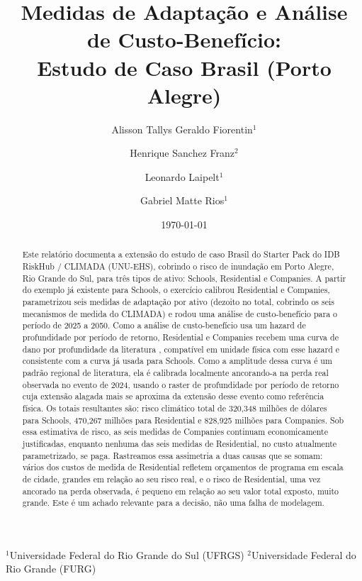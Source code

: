 \documentclass[11pt]{article}
\title{Medidas de Adaptação e Análise de Custo-Benefício:\\Estudo de Caso Brasil (Porto Alegre)}
\author{
Alisson Tallys Geraldo Fiorentin$^{1}$ \and
Henrique Sanchez Franz$^{2}$ \and
Leonardo Laipelt$^{1}$ \and
Gabriel Matte Rios$^{1}$
}
\date{\today}
\begin{document}
\maketitle

\begin{center}
\footnotesize
$^{1}$Universidade Federal do Rio Grande do Sul (UFRGS) \quad
$^{2}$Universidade Federal do Rio Grande (FURG)
\end{center}
\vspace{1em}

\begin{abstract}
Este relatório documenta a extensão do estudo de caso Brasil do Starter Pack do IDB
RiskHub / CLIMADA (UNU-EHS), cobrindo o risco de inundação em Porto Alegre, Rio Grande do
Sul, para três tipos de ativo: Schools, Residential e Companies. A partir do exemplo já
existente para Schools, o exercício calibrou Residential e Companies, parametrizou seis
medidas de adaptação por ativo (dezoito no total, cobrindo os seis mecanismos de medida do
CLIMADA) e rodou uma análise de custo-benefício para o período de 2025 a 2050. Como a
análise de custo-benefício usa um hazard de profundidade por período de retorno,
Residential e Companies recebem uma curva de dano por profundidade da literatura
\citep{huizinga2017}, compatível em unidade física com esse hazard e consistente com a
curva já usada para Schools. Como a amplitude dessa curva é um padrão regional de
literatura, ela é calibrada localmente ancorando-a na perda real observada no evento de
2024, usando o raster de profundidade por período de retorno cuja extensão alagada mais se
aproxima da extensão desse evento como referência física. Os totais resultantes são: risco
climático total de 320,348 milhões de dólares para Schools, 470,267 milhões para
Residential e 828,925 milhões para Companies. Sob essa estimativa de risco, as seis medidas
de Companies continuam economicamente justificadas, enquanto nenhuma das seis medidas de
Residential, no custo atualmente parametrizado, se paga. Rastreamos essa assimetria a duas
causas que se somam: vários dos custos de medida de Residential refletem orçamentos de
programa em escala de cidade, grandes em relação ao seu risco real, e o risco de
Residential, uma vez ancorado na perda observada, é pequeno em relação ao seu valor total
exposto, muito grande. Este é um achado
relevante para a decisão, não uma falha de modelagem.
\end{abstract}

\newpage
\tableofcontents
\newpage
\end{document}
